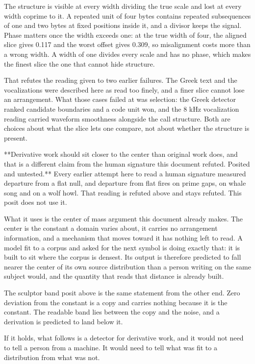 The structure is visible at every width dividing the true scale and lost at every width coprime to it. A repeated unit of four bytes contains repeated subsequences of one and two bytes at fixed positions inside it, and a divisor keeps the signal. Phase matters once the width exceeds one: at the true width of four, the aligned slice gives 0.117 and the worst offset gives 0.309, so misalignment costs more than a wrong width. A width of one divides every scale and has no phase, which makes the finest slice the one that cannot hide structure.

That refutes the reading given to two earlier failures. The Greek text and the vocalizations were described here as read too finely, and a finer slice cannot lose an arrangement. What those cases failed at was selection: the Greek detector ranked candidate boundaries and a code unit won, and the 8 kHz vocalization reading carried waveform smoothness alongside the call structure. Both are choices about what the slice lets one compare, not about whether the structure is present.

**Derivative work should sit closer to the center than original work does, and that is a different claim from the human signature this document refuted. Posited and untested.** Every earlier attempt here to read a human signature measured departure from a flat null, and departure from flat fires on prime gaps, on whale song and on a wolf howl. That reading is refuted above and stays refuted. This posit does not use it.

What it uses is the center of mass argument this document already makes. The center is the constant a domain varies about, it carries no arrangement information, and a mechanism that moves toward it has nothing left to read. A model fit to a corpus and asked for the next symbol is doing exactly that: it is built to sit where the corpus is densest. Its output is therefore predicted to fall nearer the center of its own source distribution than a person writing on the same subject would, and the quantity that reads that distance is already built.

The sculptor band posit above is the same statement from the other end. Zero deviation from the constant is a copy and carries nothing because it is the constant. The readable band lies between the copy and the noise, and a derivation is predicted to land below it.

If it holds, what follows is a detector for derivative work, and it would not need to tell a person from a machine. It would need to tell what was fit to a distribution from what was not.

